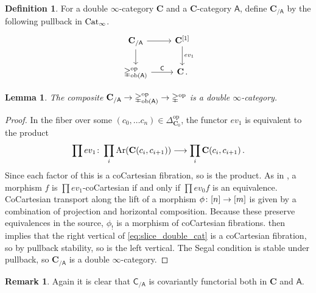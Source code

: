 \documentclass[10pt]{amsart}
\numberwithin{equation}{section}
\newtheorem{lem}[prop]{Lemma}
\theoremstyle{definition}
\newtheorem{definition}[prop]{Definition}
\newtheorem{rem}[prop]{Remark}
\DeclareMathOperator{\ob}{ob}
\DeclareMathOperator{\op}{op}
\DeclareMathOperator{\Ar}{Ar}
\newcommand{\Cat}{\mathrm{Cat}\vphantom{t}}
\newcommand{\Simp}{\mathbb{\Delta}}
\newcommand{\bfC}{\mathbf{C}}
\newcommand{\sfA}{\mathsf{A}}
\newcommand{\sfC}{\mathsf{C}}
\renewcommand{\to}{\mathchoice{\longrightarrow}{\rightarrow}{}{}}
\begin{document}
	\begin{definition}\label{def:slice_double_cat}
		For a double $\infty$-category $\bfC$ and a $\bfC$-category $\sfA$, define $\bfC_{/ \sfA}$ by the following pullback in $\Cat_{\infty}$.
		\begin{equation*}\label{eq:slice_double_cat}
			\begin{tikzcd}
				\bfC_{/ \sfA} \arrow[r] \arrow[d]      &   \bfC^{[1]}  \arrow[d, "ev_{1}"] \\
				\Simp^{\op}_{\ob(\sfA)}  \arrow[r, "\sfC"]               &  \bfC \,.
			\end{tikzcd}
		\end{equation*}
	\end{definition}
	\begin{lem}\label{prop:overcategory}
		The composite $\bfC_{/\sfA} \to \Simp^{\op}_{\ob(\sfA)} \to \Simp^{\op}$ is a double $\infty$-category.
	\end{lem}
	\begin{proof}
		In the fiber over some $(c_{0},\dots c_{n}) \in \Simp^{\op}_{\bfC_{0}}$, the functor $ev_1$ is equivalent to the product
		\begin{align*}
			\prod ev_1 \colon \prod_{i} \Ar(\bfC(c_{i},c_{i+1})) \to  \prod_{i} \bfC(c_{i},c_{i+1})\,.
		\end{align*}
		Since each factor of this is a coCartesian fibration, so is the product. As in , a morphism $f$ is $\prod ev_1$-coCartesian if and only if $\prod ev_{0}f$ is an equivalence. CoCartesian transport along the lift of a morphism $\phi \colon [n]\to [m]$ is given by a combination of projection and horizontal composition. Because these preserve equivalences in the source, $\phi_!$ is a morphism of coCartesian fibrations.
     then implies that the right vertical of \eqref{eq:slice_double_cat} is a coCartesian fibration, so by pullback stability, so is the left vertical.
    The Segal condition is stable under pullback, so $\bfC_{/\sfA}$ is a double $\infty$-category.
	\end{proof}

	\begin{rem}\label{rem:slice_is_functorial}
		Again it is clear that $\sfC_{/\sfA}$ is covariantly functorial both in $\bfC$ and $\sfA$.
	\end{rem}
\end{document}
